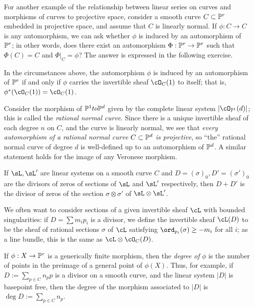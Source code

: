 For another example of the relationship between linear series on curves and morphisms of curves to projective space, consider a smooth curve $C \subset \PP^r$ embedded in projective space, and assume that $C$ is linearly normal. If $\phi : C \to C$ is any automorphism, we can ask whether $\phi$ is induced by an automorphism of $\PP^r$; in other words, does there exist an automorphism $\Phi : \PP^r \to \PP^r$ such that $\Phi(C) = C$ and $\Phi|_C = \phi$? The answer is expressed in the following exercise.

\begin{exercise}\label{projective automorphism}
In the circumstances above, the automorphism $\phi$ is induced by an automorphism of $\PP^r$ if and only if $\phi$ carries the invertible sheaf $\cO_{C}(1)$ to itself; that is, $\phi^*(\cO_{C}(1)) = \cO_{C}(1)$.
\end{exercise}

\begin{example}
Consider the morphism of $\PP^1to \PP^d$ given by the complete linear system $|\cO_{\PP^1}(d)|$; this is called the \emph{rational normal curve}. Since there is a unique invertible sheaf of each degree $n$ on $C$, and the curve is linearly normal, we see that \emph{every automorphism of a rational normal curve $C \subset \PP^d$  is projective}, so ``the'' rational normal curve of degree $d$ is well-defined up to an automorphism of $\PP^d$.  A similar statement holds
for the image of any Veronese morphism.
\end{example}

If $\sL, \sL'$ are linear systems on a smooth curve $C$ and $D = (\sigma)_0,D' = (\sigma')_0$ are the divisors of zeros of sections of $\sL$ and $\sL'$ respectively, then $D+D'$ is the divisor of zeros of the section $\sigma\otimes \sigma'$ of
$\sL\otimes \sL'$.

We  often want to consider sections of a given invertible sheaf $\cL$ with bounded singularities: if $D = \sum m_ip_i$ is a divisor, we define the invertible sheaf $\cL(D)$ to be the sheaf of rational sections $\sigma$ of $\cL$ satisfying $\ord_{p_i}(\sigma) \geq -m_i$ for all $i$; as a line bundle, this is the same as $\cL \otimes \cO_C(D)$.

If $\phi:X \to \PP^r$ is a generically finite morphism, then the \emph{degree of $\phi$} is the number of points in the preimage of a general point of $\phi(X)$. Thus, for example, if $D := \sum_{p\in C} n_pp$ is a divisor on a smooth curve, and the linear system $|D|$ is basepoint free, then the degree of the morphism associated to $|D|$ is $\deg D := \sum_{p\in C} n_p$.

